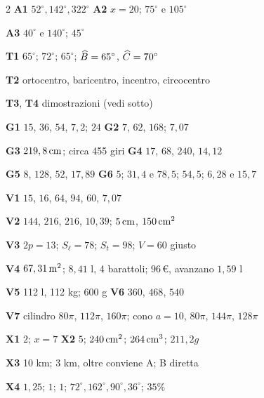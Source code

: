 {\begin{multicols}{2}
\textbf{A1} $52^\circ,142^\circ,322^\circ$ \quad \textbf{A2} $x=20$; $75^\circ$ e $105^\circ$\par
\textbf{A3} $40^\circ$ e $140^\circ$; $45^\circ$\par
\textbf{T1} $65^\circ$; $72^\circ$; $65^\circ$; $\widehat{B}=65^\circ$, $\widehat{C}=70^\circ$\par
\textbf{T2} ortocentro, baricentro, incentro, circocentro\par
\textbf{T3}, \textbf{T4} dimostrazioni (vedi sotto)\par
\textbf{G1} $15$, $36$, $54$, $7,2$; $24$ \quad \textbf{G2} $7$, $62$, $168$; $7,07$\par
\textbf{G3} $219,8\,\mathrm{cm}$; circa 455 giri \quad \textbf{G4} $17$, $68$, $240$, $14,12$\par
\textbf{G5} $8$, $128$, $52$, $17,89$ \quad \textbf{G6} $5$; $31,4$ e $78,5$; $54,5$; $6,28$ e $15,7$\par
\textbf{V1} $15$, $16$, $64$, $94$, $60$, $7,07$\par
\textbf{V2} $144$, $216$, $216$, $10,39$; $5\,\mathrm{cm}$, $150\,\mathrm{cm^2}$\par
\textbf{V3} $2p=13$; $S_\ell=78$; $S_t=98$; $V=60$ giusto\par
\textbf{V4} $67,31\,\mathrm{m^2}$; $8,41$ l, 4 barattoli; $96$\,€, avanzano $1,59$ l\par
\textbf{V5} 112 l, 112 kg; 600 g \quad \textbf{V6} $360$, $468$, $540$\par
\textbf{V7} cilindro $80\pi$, $112\pi$, $160\pi$; cono $a=10$, $80\pi$, $144\pi$, $128\pi$\par
\textbf{X1} $2$; $x=7$ \quad \textbf{X2} $5$; $240\,\mathrm{cm^2}$; $264\,\mathrm{cm^3}$; $211,2\unit{g}$\par
\textbf{X3} 10 km; 3 km, oltre conviene A; B diretta\par
\textbf{X4} $1,25$; $1$; $1$; $72^\circ,162^\circ,90^\circ,36^\circ$; $35\%$\par
\end{multicols}
}
